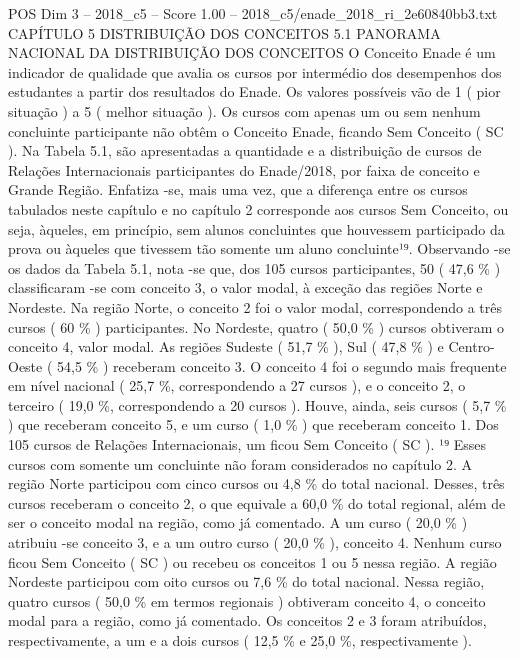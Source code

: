\begin{textsample}{POS Dim 3 – 2018\_c5 – Score 1.00 – 2018\_c5/enade\_2018\_ri\_2e60840bb3.txt}  \label{ex:f3_pos_181}
CAPÍTULO 5 DISTRIBUIÇÃO DOS CONCEITOS 5.1 PANORAMA NACIONAL DA DISTRIBUIÇÃO DOS CONCEITOS O Conceito Enade é um indicador de qualidade que avalia os cursos por intermédio dos desempenhos dos estudantes a partir dos resultados do Enade.
Os valores possíveis vão de 1 ( pior situação ) a 5 ( melhor situação ).
Os cursos com apenas um ou sem nenhum concluinte participante não obtêm o Conceito Enade, ficando Sem Conceito ( SC ).
Na Tabela 5.1, são apresentadas a quantidade e a distribuição de cursos de Relações Internacionais participantes do Enade/2018, por faixa de conceito e Grande Região.
Enfatiza -se, mais uma vez, que a diferença entre os cursos tabulados neste capítulo e no capítulo 2 corresponde aos cursos Sem Conceito, ou seja, àqueles, em princípio, sem alunos concluintes que houvessem participado da prova ou àqueles que tivessem tão somente um aluno concluinte¹⁹.
Observando -se os dados da Tabela 5.1, nota -se que, dos 105 cursos participantes, 50 ( 47,6 \% ) classificaram -se com conceito 3, o valor modal, à exceção das regiões Norte e Nordeste.
Na região Norte, o conceito 2 foi o valor modal, correspondendo a três cursos ( 60 \% ) participantes.
No Nordeste, quatro ( 50,0 \% ) cursos obtiveram o conceito 4, valor modal.
As regiões Sudeste ( 51,7 \% ), Sul ( 47,8 \% ) e Centro-Oeste ( 54,5 \% ) receberam conceito 3.
O conceito 4 foi o segundo mais frequente em nível nacional ( 25,7 \%, correspondendo a 27 cursos ), e o conceito 2, o terceiro ( 19,0 \%, correspondendo a 20 cursos ).
Houve, ainda, seis cursos ( 5,7 \% ) que receberam conceito 5, e um curso ( 1,0 \% ) que receberam conceito 1.
Dos 105 cursos de Relações Internacionais, um ficou Sem Conceito ( SC ). ¹⁹ Esses cursos com somente um concluinte não foram considerados no capítulo 2.
A região Norte participou com cinco cursos ou 4,8 \% do total nacional.
Desses, três cursos receberam o conceito 2, o que equivale a 60,0 \% do total regional, além de ser o conceito modal na região, como já comentado.
A um curso ( 20,0 \% ) atribuiu -se conceito 3, e a um outro curso ( 20,0 \% ), conceito 4.
Nenhum curso ficou Sem Conceito ( SC ) ou recebeu os conceitos 1 ou 5 nessa região.
A região Nordeste participou com oito cursos ou 7,6 \% do total nacional.
Nessa região, quatro cursos ( 50,0 \% em termos regionais ) obtiveram conceito 4, o conceito modal para a região, como já comentado.
Os conceitos 2 e 3 foram atribuídos, respectivamente, a um e a dois cursos ( 12,5 \% e 25,0 \%, respectivamente ).

\end{textsample}
